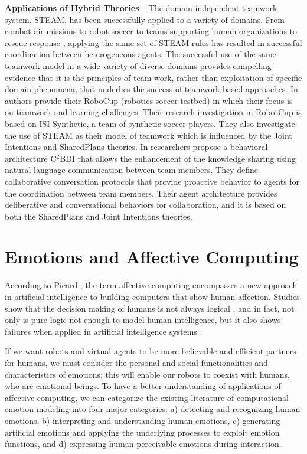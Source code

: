 \documentclass[12pt]{report}
\begin{document}
\textbf{Applications of Hybrid Theories} -- The domain independent teamwork
system, STEAM, has been successfully applied to a variety of domains.  From
combat air missions \cite{hill:synthetic-battlefield-aircraft} to robot soccer
\cite{kitano:robocup} to teams supporting human organizations
\cite{pynadath:teamwork-heterogeneous-agents} to rescue response
\cite{scerri:robot-agent-person}, applying the same set of STEAM rules has
resulted in successful coordination between heterogeneous agents. The successful
use of the same teamwork model in a wide variety of diverse domains provides
compelling evidence that it is the principles of team-work, rather than
exploitation of specific domain phenomena, that underlies the success of
teamwork based approaches. In \cite{marsella:robocup} authors provide their
RoboCup (robotics soccer testbed) in which their focus is on teamwork and
learning challenges. Their research investigation in RobotCup is based on ISI
Synthetic, a team of synthetic soccer-players. They also investigate the use of
STEAM as their model of teamwork which is influenced by the Joint Intentions and
SharedPlans theories. In \cite{kabil:coordination-mechanisms} researchers
propose a behavioral architecture C$^2$BDI that allows the enhancement of the
knowledge sharing using natural language communication between team members.
They define collaborative conversation protocols that provide proactive behavior
to agents for the coordination between team members. Their agent architecture
provides deliberative and conversational behaviors for collaboration, and it is
based on both the SharedPlans and Joint Intentions theories.

\section{Emotions and Affective Computing}
According to Picard \cite{picard:affective-computing}, the term affective
computing encompasses a new approach in artificial intelligence to building
computers that show human affection. Studies show that the decision making of
humans is not always logical \cite{GrossbergGutowski:affect-cognition}, and in
fact, not only is pure logic not enough to model human intelligence, but it also
shows failures when applied in artificial intelligence systems
\cite{dreyfus:artificial-critique}.

If we want robots and virtual agents to be more believable and efficient
partners for humans, we must consider the personal and social functionalities
and characteristics of emotions; this will enable our robots to coexist with
humans, who are emotional beings. To have a better understanding of applications
of affective computing, we can categorize the existing literature of
computational emotion modeling into four major categories: a) detecting and
recognizing human emotions, b) interpreting and understanding human emotions, c)
generating artificial emotions and applying the underlying processes to exploit
emotion functions, and d) expressing human-perceivable emotions during
interaction.
\end{document}

